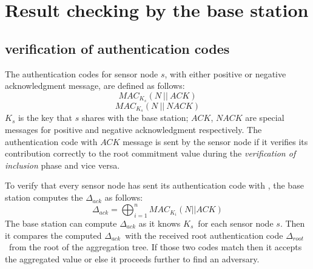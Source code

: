 \section{Result checking by the base station}
	\subsection{verification of authentication codes}
		\label{sec:verficiation-of-authentication-codes}
		The authentication codes for sensor node $s$, with either positive or negative acknowledgment message, are defined as follows:
		\begin{equation}
			MAC_{K_{s}}(N\ ||\ \textit{ACK})
		\end{equation}
		\begin{equation}
			MAC_{K_{s}}(N\ ||\ \textit{NACK})
		\end{equation}
		$K_{s}$ is the key that $s$ shares with the base station;
		$\textit{ACK}$, $\textit{NACK}$ are special messages for positive and negative acknowledgment respectively.
		The authentication code with $\textit{ACK}$ message is sent by the sensor node if it verifies its contribution correctly to the root commitment value during the 
		\textit{verification of inclusion} phase and vice versa.
		
		To verify that every sensor node has sent its authentication code with \ack, the base station computes the $\Delta_{ack}$ as follows:
		\begin{equation}
			\displaystyle{\Delta_{ack} = \bigoplus_{i = 1}^n MAC_{K_{i}}(N || ACK) }
		\end{equation}
		The base station can compute $\Delta_{ack}$ as it knows $K_{s}$\ for each sensor node $s$.
		Then it compares the computed $\Delta_{ack}$\ with the received root authentication code $\Delta_{root}$\ from the root of the aggregation tree. 
		If those two codes match then it accepts the aggregated value or else it proceeds further to find an adversary. 

